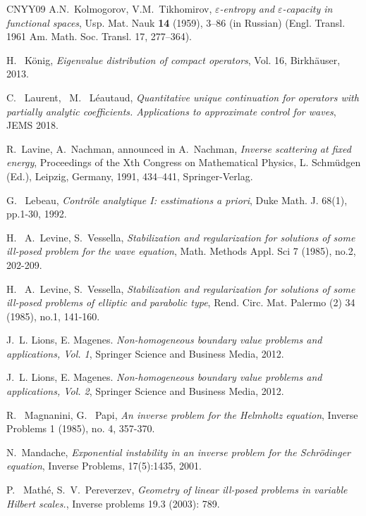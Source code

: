 \documentclass[12pt,twoside]{amsart}
\numberwithin{equation}{section}
\newcommand{\eps}{\varepsilon}
\begin{document}
\begin{thebibliography}{CNYY09}
A.N.\ Kolmogorov, V.M.\ Tikhomirov, \textit{{$\eps$-entropy and $\eps$-capacity in functional spaces}}, Usp. Mat. Nauk {\bf 14} (1959), 3--86 (in Russian) (Engl. Transl. 1961 Am. Math. Soc. Transl. 17, 277--364).

H. \ K{\"o}nig, \textit{{Eigenvalue distribution of compact operators}}, Vol. 16, Birkh{\"a}user, 2013.


C. \ Laurent, \ M. \ L{\'e}autaud, \textit{{Quantitative unique continuation for operators with partially analytic coefficients. Applications to approximate control for waves}}, JEMS 2018.

R.~Lavine, A.~Nachman, announced in A.\ Nachman, \textit{Inverse scattering
at fixed energy}, Proceedings of the Xth Congress on Mathematical Physics, L. Schm\"udgen (Ed.), Leipzig, Germany, 1991, 434--441, Springer-Verlag. 


G. \ Lebeau, \textit{{Contr{\^o}le analytique I: esstimations a priori}}, Duke Math. J. 68(1), pp.1-30, 1992. 

H. \ A.\ Levine, S.\ Vessella, 
\textit{{Stabilization and regularization for solutions of some ill-posed problem for the wave equation}}, Math. Methods Appl. Sci 7 (1985), no.2, 202-209.


H. \ A.\ Levine, S.\ Vessella, 
\textit{{Stabilization and regularization for solutions of some ill-posed problems of elliptic and parabolic type}}, Rend. Circ. Mat. Palermo (2) 34 (1985), no.1, 141-160.

J.\ L. Lions, E. Magenes. \textit{Non-homogeneous boundary value problems and applications, Vol. 1}, Springer Science and Business Media, 2012.

J.\ L. Lions, E. Magenes. \textit{Non-homogeneous boundary value problems and applications, Vol. 2}, Springer Science and Business Media, 2012.


R. \ Magnanini, G. \ Papi,
\textit{{An inverse problem for the Helmholtz equation}}, Inverse Problems 1 (1985), no. 4, 357-370.


N.\ Mandache, \textit{{Exponential instability in an inverse problem for the Schr\"odinger equation}}, Inverse Problems, 17(5):1435, 2001.

P. \ Math\'e, S.\ V.\ Pereverzev, \textit{{Geometry of linear ill-posed problems in variable Hilbert scales.}}, Inverse problems 19.3 (2003): 789.



\end{thebibliography}
\end{document}
